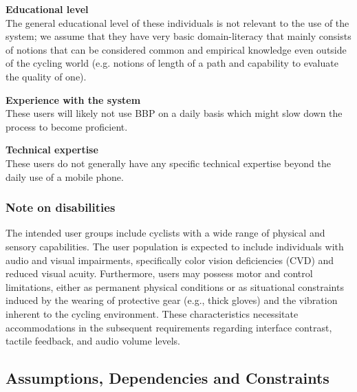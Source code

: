 \documentclass{article}
\begin{document}
\vspace{0.5cm}
\noindent
\textbf{Educational level}\\
The general educational level of these individuals is not relevant to the use of the system; we assume that they have very basic domain-literacy that mainly consists of notions that can be considered common and empirical knowledge even outside of the cycling world (e.g. notions of length of a path and capability to evaluate the quality of one).

\vspace{0.5cm}
\noindent
\textbf{Experience with the system}\\
These users will likely not use BBP on a daily basis which might slow down the process to become proficient.

\vspace{0.5cm}
\noindent
\textbf{Technical expertise}\\
These users do not generally have any specific technical expertise beyond the daily use of a mobile phone.

\subsubsection{Note on disabilities}
The intended user groups include cyclists with a wide range of physical and sensory capabilities. The user population is expected to include individuals with audio and visual impairments, specifically color vision deficiencies (CVD) and reduced visual acuity. Furthermore, users may possess motor and control limitations, either as permanent physical conditions or as situational constraints induced by the wearing of protective gear (e.g., thick gloves) and the vibration inherent to the cycling environment. These characteristics necessitate accommodations in the subsequent requirements regarding interface contrast, tactile feedback, and audio volume levels.

\subsection{Assumptions, Dependencies and Constraints}
\end{document}
